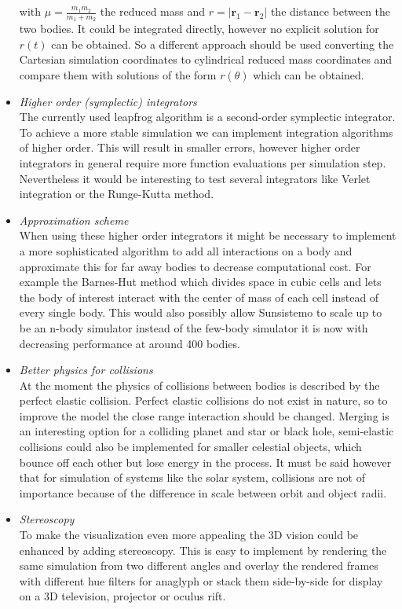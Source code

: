 \documentclass[a4paper]{article}
\newcommand{\vect}[1]{\boldsymbol{#1}}
\begin{document}
\begin{itemize}
with $\mu = \frac{m_1 m_2}{m_1 + m_2}$ the reduced mass and $r = |{\vect{r}_1 - \vect{r}_2}|$ the
distance between the two bodies. It could be integrated directly, however no explicit solution for
$r(t)$ can be obtained. So a different approach should be used converting the Cartesian simulation
coordinates to cylindrical reduced mass coordinates and compare them with solutions of the form
$r(\theta)$ which can be obtained.


\item \emph{Higher order (symplectic) integrators}\\
  The currently used leapfrog algorithm is a second-order symplectic integrator. To achieve a more
  stable simulation we can implement integration algorithms of higher order. This will result in
  smaller errors, however higher order integrators in general require more function evaluations per
  simulation step. Nevertheless it would be interesting to test several integrators like Verlet
  integration or the Runge-Kutta method.

\item \emph{Approximation scheme}\\
  When using these higher order integrators it might be necessary to implement a more sophisticated
  algorithm to add all interactions on a body and approximate this for far away bodies to decrease
  computational cost. For example the Barnes-Hut method which divides space in cubic cells and lets
  the body of interest interact with the center of mass of each cell instead of every single body.
  This would also possibly allow Sunsistemo to scale up to be an n-body simulator instead of the
  few-body simulator it is now with decreasing performance at around 400 bodies.

\item \emph{Better physics for collisions}\\
  At the moment the physics of collisions between bodies is described by the perfect elastic
  collision. Perfect elastic collisions do not exist in nature, so to improve the model the close
  range interaction should be changed. Merging is an interesting option for a colliding planet and
  star or black hole, semi-elastic collisions could also be implemented for smaller celestial
  objects, which bounce off each other but lose energy in the process. It must be said however that
  for simulation of systems like the solar system, collisions are not of importance because of the
  difference in scale between orbit and object radii.

\item \emph{Stereoscopy}\\
  To make the visualization even more appealing the 3D vision could be enhanced by adding
  stereoscopy. This is easy to implement by rendering the same simulation from two different angles
  and overlay the rendered frames with different hue filters for anaglyph or stack them side-by-side
  for display on a 3D television, projector or oculus rift.
\end{itemize}




\end{document}
